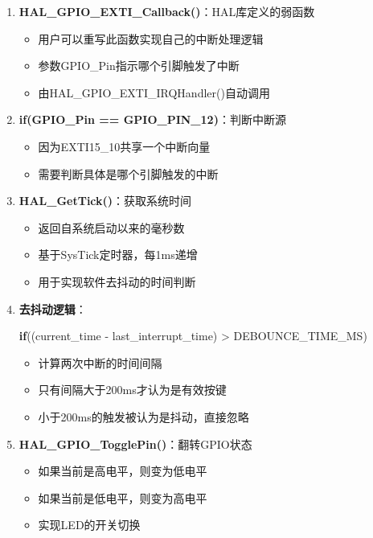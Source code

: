 \documentclass[
  chinese,
  UTF8,
  oneside,
  openany]{ctexbook}
\newenvironment{Shaded}{}{}
\newcommand{\ControlFlowTok}[1]{\textcolor[rgb]{0.00,0.44,0.13}{\textbf{#1}}}
\newcommand{\NormalTok}[1]{#1}
\newcommand{\OperatorTok}[1]{\textcolor[rgb]{0.40,0.40,0.40}{#1}}
\providecommand{\tightlist}{%
  \setlength{\itemsep}{0pt}\setlength{\parskip}{0pt}}
\begin{document}
\begin{enumerate}
\def\labelenumi{\arabic{enumi}.}
\item
  \textbf{HAL\_GPIO\_EXTI\_Callback()}：HAL库定义的弱函数

  \begin{itemize}
  \tightlist
  \item
    用户可以重写此函数实现自己的中断处理逻辑
  \item
    参数GPIO\_Pin指示哪个引脚触发了中断
  \item
    由HAL\_GPIO\_EXTI\_IRQHandler()自动调用
  \end{itemize}
\item
  \textbf{if(GPIO\_Pin == GPIO\_PIN\_12)}：判断中断源

  \begin{itemize}
  \tightlist
  \item
    因为EXTI15\_10共享一个中断向量
  \item
    需要判断具体是哪个引脚触发的中断
  \end{itemize}
\item
  \textbf{HAL\_GetTick()}：获取系统时间

  \begin{itemize}
  \tightlist
  \item
    返回自系统启动以来的毫秒数
  \item
    基于SysTick定时器，每1ms递增
  \item
    用于实现软件去抖动的时间判断
  \end{itemize}
\item
  \textbf{去抖动逻辑}：

\begin{Shaded}
\begin{Highlighting}[]
\ControlFlowTok{if}\OperatorTok{((}\NormalTok{current\_time }\OperatorTok{{-}}\NormalTok{ last\_interrupt\_time}\OperatorTok{)} \OperatorTok{\textgreater{}}\NormalTok{ DEBOUNCE\_TIME\_MS}\OperatorTok{)}
\end{Highlighting}
\end{Shaded}

  \begin{itemize}
  \tightlist
  \item
    计算两次中断的时间间隔
  \item
    只有间隔大于200ms才认为是有效按键
  \item
    小于200ms的触发被认为是抖动，直接忽略
  \end{itemize}
\item
  \textbf{HAL\_GPIO\_TogglePin()}：翻转GPIO状态

  \begin{itemize}
  \tightlist
  \item
    如果当前是高电平，则变为低电平
  \item
    如果当前是低电平，则变为高电平
  \item
    实现LED的开关切换
  \end{itemize}
\end{enumerate}
\end{document}
